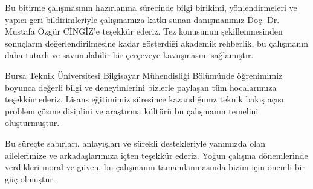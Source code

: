 \documentclass{btu-thesis}
\begin{document}
\BTUfrontmatter
\BTUmakecover
\BTUmakeinnercover
\thispagestyle{btunofooter}\null\clearpage
\BTUmakeapprovalpage
\BTUmakeplagiarism

\begin{BTUforeword}
Bu bitirme çalışmasının hazırlanma sürecinde bilgi birikimi, yönlendirmeleri ve yapıcı geri bildirimleriyle çalışmamıza katkı sunan danışmanımız Doç. Dr. Mustafa Özgür CİNGİZ'e teşekkür ederiz. Tez konusunun şekillenmesinden sonuçların değerlendirilmesine kadar gösterdiği akademik rehberlik, bu çalışmanın daha tutarlı ve savunulabilir bir çerçeveye kavuşmasını sağlamıştır.

Bursa Teknik Üniversitesi Bilgisayar Mühendisliği Bölümünde öğrenimimiz boyunca değerli bilgi ve deneyimlerini bizlerle paylaşan tüm hocalarımıza teşekkür ederiz. Lisans eğitimimiz süresince kazandığımız teknik bakış açısı, problem çözme disiplini ve araştırma kültürü bu çalışmanın temelini oluşturmuştur.

Bu süreçte sabırları, anlayışları ve sürekli destekleriyle yanımızda olan ailelerimize ve arkadaşlarımıza içten teşekkür ederiz. Yoğun çalışma dönemlerinde verdikleri moral ve güven, bu çalışmanın tamamlanmasında bizim için önemli bir güç olmuştur.

\BTUforewordsignature
\end{BTUforeword}

\BTUaddcontents
\end{document}
